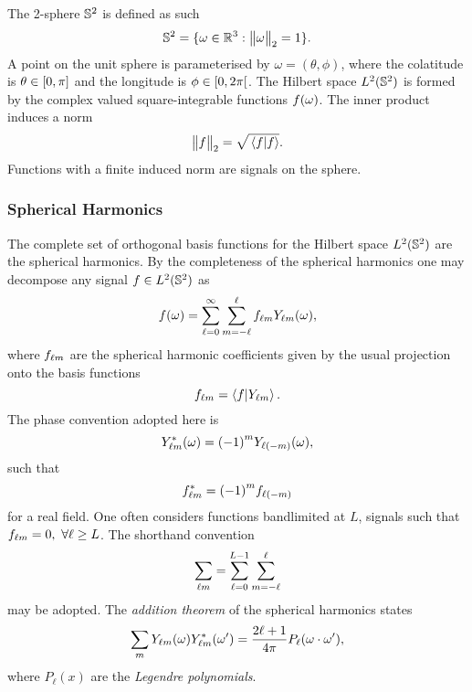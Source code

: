 The 2-sphere \(\twoSphere{}\) is defined as such
%
\begin{equation}
	\twoSphere{} = \set{\omega \in \mathbb{R}^{3} : \norm{\omega} = 1}.
\end{equation}
%
A point on the unit sphere is parameterised by \(\omega=(\theta,\phi)\), where the colatitude is \(\theta \in \interval{0}{\pi}\) and the longitude is \(\phi \in \interval[open right]{0}{2\pi}\).
The Hilbert space \(\hilbert{\twoSphere}\) is formed by the complex valued square-integrable functions \(\pixel{f}\).
The inner product induces a norm
%
\begin{equation}
	\norm{f} = \sqrt{\braket*{f}}.
\end{equation}
%
Functions with a finite induced norm are signals on the sphere.

\subsubsection{Spherical Harmonics}

The complete set of orthogonal basis functions for the Hilbert space \(\hilbert{\twoSphere}\) are the spherical harmonics.
By the completeness of the spherical harmonics one may decompose any signal \(f \in \hilbert{\twoSphere}\) as
%
\begin{equation}
	\pixel{f}
	= \sum\limits_{\ell=0}^{\infty} \sum\limits_{m=-\ell}^{\ell} \harmonic{f} \pixel{\harmonic{Y}},
\end{equation}
%
where \(\harmonic{f}\) are the spherical harmonic coefficients given by the usual projection onto the basis functions
%
\begin{equation}
	\harmonic{f}
	= \braket{f}{\harmonic{Y}}.
\end{equation}
%
The phase convention adopted here is
%
\begin{equation}
	\pixel{\conj{\harmonic{Y}}}
	= {(-1)}^{m} \pixel{Y_{\ell(-m)}},
\end{equation}
%
such that
%
\begin{equation}
	\conj{\harmonic{f}}
	= {(-1)}^{m} f_{\ell(-m)}
\end{equation}
%
for a real field.
One often considers functions bandlimited at \(L\), \ie{} signals such that \(\harmonic{f} = 0,\ \forall \ell \geq L\).
The shorthand convention
%
\begin{equation}
	\harmonicSum
	= \sum\limits_{\ell=0}^{L-1} \sum\limits_{m=-\ell}^{\ell}
\end{equation}
%
may be adopted.
The \emph{addition theorem} of the spherical harmonics states
%
\begin{equation}\label{eq:chapter3_addition_theorem}
	\sum\limits_{m} \pixel{\harmonic{Y}} \pixel[']{\conj{\harmonic{Y}}}
	= \factor P_{\ell}(\omega \cdot \omega'),
\end{equation}
%
where \(P_{\ell}(x)\) are the \emph{Legendre polynomials}.

